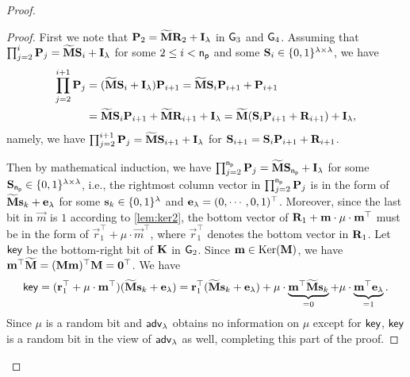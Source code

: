\begin{proof}
\begin{proof}
First we note that $\matr P_2=\sM\sR_2+\matI$ in $\gameg_3$ and $\gameg_4$. Assuming that $\prod_{j=2}^i\matr P_j=\sM\matr S_i+\matI$ for some $2\leq i<\pnum$ and some $\matr S_i\in\bins$, we have 
\[\begin{split}
\prod_{j=2}^{i+1}\matr P_j&=(\sM\matr S_i+\matI)\matr P_{i+1}=\sM\matr S_i\matr P_{i+1}+\matr P_{i+1}\\
&=\sM\matr S_i\matr P_{i+1}+\sM\sR_{i+1}+\matI=\sM(\matr S_i\matr P_{i+1}+\sR_{i+1})+\matI,
\end{split}\]
namely, we have $\prod_{j=2}^{i+1}\matr P_j=\sM\matr S_{i+1}+\matI$ for $\matr S_{i+1}=\matr S_i\matr P_{i+1}+\sR_{i+1}$. 

Then by mathematical induction, we have $\prod_{j=2}^\pnum\matr P_j=\sM\matr S_\pnum+\matI$ for some $\matr S_\pnum\in\bins$, i.e., the rightmost column vector in $\prod_{j=2}^\pnum\matr P_j$ is in the form of $\sM\vec s_k+\vece$ for some $\vec s_k\in\bin^\lambda$ and $\vece=(0,\cdots,0,1)^\top$.
Moreover, since the last bit in $\vec m$ is $1$ according to \cref{lem:ker2}, the bottom vector of $\sR_1+\vec m\cdot\mu\cdot\vec m^\top$ must be in the form of $\vec r_1^\top+\mu\cdot\vec m^\top$, where $\vec r_1^\top$ denotes the bottom vector in $\sR_1$.
Let $\key$ be the bottom-right bit of $\matr K$ in $\gameg_2$. 
Since $\vec m\in\Ker(\matr M)$, we have $\vec m^\top\sM=(\matr M\vec m)^\top\matr M=\vec 0^\top$.
We have 
\[\begin{split}
\key=(\vec r_1^\top+\mu\cdot\vec m^\top)(\sM\vec s_k+\vece)
=\vec r_1^\top(\sM\vec s_k+\vece)+\mu\cdot\underbrace{\vec m^\top\sM\vec s_k}_{=0}+\mu\cdot\underbrace{\vec m^\top\vece}_{=1}.
\end{split}\]
Since $\mu$ is a random bit and $\adv$ obtains no information on $\mu$ except for $\key$, $\key$ is a random bit in the view of $\adv$ as well, completing this part of the proof.
\end{proof}


\end{proof}
